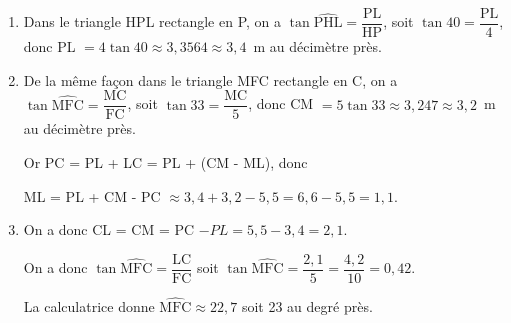 \begin{enumerate}
\item %
Dans le triangle HPL rectangle en P, on a $\tan \widehat{\text{PHL}} = \dfrac{\text{PL}}{\text{HP}}$, soit $\tan 40 = \dfrac{\text{PL}}{4}$, donc PL $ = 4\tan 40 \approx 3,3564 \approx 3,4$~m au décimètre près.
\item %
De la même façon dans le triangle MFC rectangle en C, on a $\tan \widehat{\text{MFC}} = \dfrac{\text{MC}}{\text{FC}}$, soit $\tan 33 = \dfrac{\text{MC}}{5}$, donc CM $ = 5\tan 33 \approx 3,247 \approx 3,2$~m au décimètre près.

Or PC = PL + LC = PL + (CM - ML), donc 

ML = PL + CM - PC $\approx 3,4 + 3,2 - 5,5 = 6,6 - 5,5 = 1,1$. 
\item %

On a donc CL = CM = PC $- PL = 5,5 - 3,4 = 2,1$.

On a donc  $\tan \widehat{\text{MFC}} = \dfrac{\text{LC}}{\text{FC}}$ soit $\tan \widehat{\text{MFC}} = \dfrac{2,1}{5} = \dfrac{4,2}{10} = 0,42$.

La calculatrice donne  $\widehat{\text{MFC}} \approx 22,7$ soit 23\degres{} au degré près.
\end{enumerate} 

\vspace{0,5cm}


